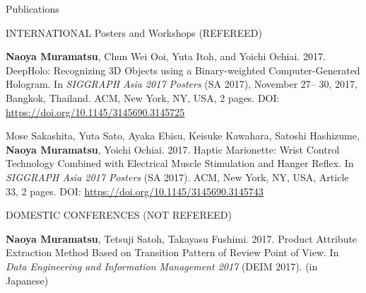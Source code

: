 \documentclass{resume} %
\begin{document}
\begin{rSection}{Publications}
\begin{rSubsection}{INTERNATIONAL Posters and Workshops (REFEREED)}{}{}{}{}
        \item \textbf{Naoya Muramatsu}, Chun Wei Ooi, Yuta Itoh, and Yoichi Ochiai. 2017. DeepHolo: Recognizing 3D Objects using a Binary-weighted Computer-Generated Hologram. In \textit{SIGGRAPH Asia 2017 Posters} (SA 2017), November 27– 30, 2017, Bangkok, Thailand. ACM, New York, NY, USA, 2 pages. DOI: \url{https://doi.org/10.1145/3145690.3145725}

        \item Mose Sakashita, Yuta Sato, Ayaka Ebisu, Keisuke Kawahara, Satoshi Hashizume, \textbf{Naoya Muramatsu}, Yoichi Ochiai. 2017. Haptic Marionette: Wrist Control Technology Combined with Electrical Muscle Stimulation and Hanger Reflex. In \textit{SIGGRAPH Asia 2017 Posters} (SA 2017). ACM, New York, NY, USA, Article 33, 2 pages. DOI: \url{https://doi.org/10.1145/3145690.3145743}
    \end{rSubsection}



    \begin{rSubsection}{DOMESTIC CONFERENCES (NOT REFEREED)}{}{}{}{}
        \item \textbf{Naoya Muramatsu}, Tetsuji Satoh, Takayasu Fushimi. 2017. Product Attribute Extraction Method Based on Transition Pattern of Review Point of View. In \textit{Data Engineering and Information Management 2017} (DEIM 2017). (in Japanese) %
    \end{rSubsection}




\end{rSection}
\end{document}

